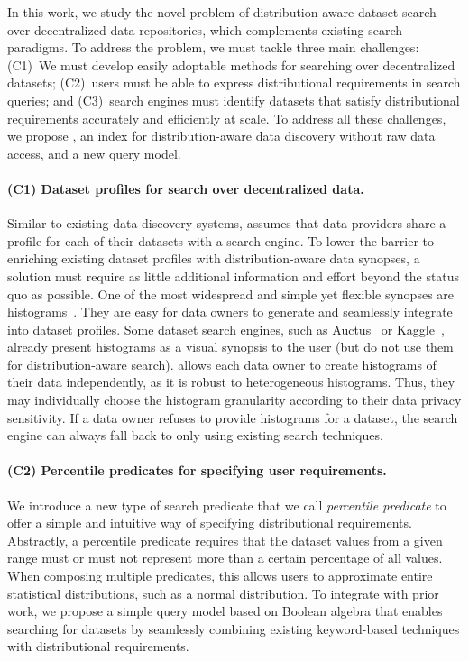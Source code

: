In this work, we study the novel problem of distribution-aware dataset search over decentralized data repositories, which complements existing search paradigms.
To address the problem, we must tackle three main challenges:
(C1)~We must develop easily adoptable methods for searching over decentralized datasets;
(C2)~users must be able to express distributional requirements in search queries; and
(C3)~search engines must identify datasets that satisfy distributional requirements accurately and efficiently at scale.
To address all these challenges, we propose \system{}, an index for distribution-aware data discovery without raw data access, and a new query model.

\paragraph{(C1) Dataset profiles for search over decentralized data.}
Similar to existing data discovery systems, \system{} assumes that data providers share a profile for each of their datasets with a search engine.
To lower the barrier to enriching existing dataset profiles with distribution-aware data synopses, a solution must require as little additional information and effort beyond the status quo as possible.
One of the most widespread and simple yet flexible synopses are histograms~\cite{cormode_synopses_2011}.
They are easy for data owners to generate and seamlessly integrate into dataset profiles.
Some dataset search engines, such as Auctus~\cite{castelo_auctus_2021} or Kaggle~\cite{kaggle_inc_kaggle_2024}, already present histograms as a visual synopsis to the user (but do not use them for distribution-aware search).
\system{} allows each data owner to create histograms of their data independently, as it is robust to heterogeneous histograms.
Thus, they may individually choose the histogram granularity according to their data privacy sensitivity.
If a data owner refuses to provide histograms for a dataset, the search engine can always fall back to only using existing search techniques.

\paragraph{(C2) Percentile predicates for specifying user requirements.}
We introduce a new type of search predicate that we call \emph{percentile predicate} to offer a simple and intuitive way of specifying distributional requirements.
Abstractly, a percentile predicate requires that the dataset values from a given range must or must not represent more than a certain percentage of all values.
When composing multiple predicates, this allows users to approximate entire statistical distributions, such as a normal distribution.
To integrate with prior work, we propose a simple query model based on Boolean algebra that enables searching for datasets by seamlessly combining existing keyword-based techniques with distributional requirements.


